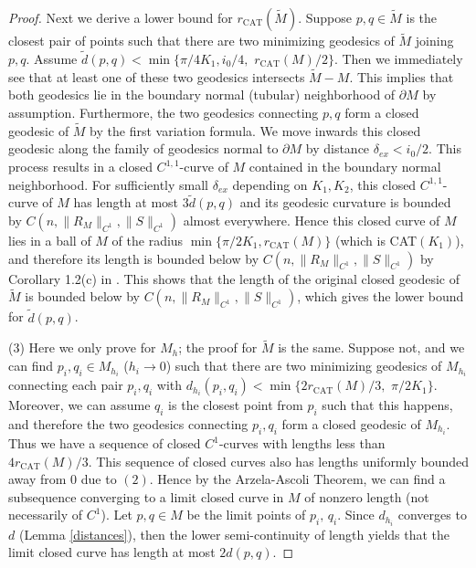 \documentclass[11pt,letterpaper]{amsart}
\numberwithin{equation}{section}
\theoremstyle{definition}
\theoremstyle{plain}
\theoremstyle{definition}
\theoremstyle{plain}
\theoremstyle{definition}
\theoremstyle{plain}
\begin{document}
\begin{proof}
Next we derive a lower bound for $r_{\textrm{CAT}}(\widetilde{M})$. Suppose $p,q\in \widetilde{M}$ is the closest pair of points such that there are two minimizing geodesics of $\widetilde{M}$ joining $p,q$. Assume $\widetilde{d}(p,q)<\min\{\pi/4K_1,i_0/4,$ $r_{\textrm{CAT}}(M)/2\}$. Then we immediately see that at least one of these two geodesics intersects $\widetilde{M}-M$.
This implies that both geodesics lie in the boundary normal (tubular) neighborhood of $\partial M$ by assumption. 
Furthermore, the two geodesics connecting $p,q$ form a closed geodesic of $\widetilde{M}$ by the first variation formula. 
We move inwards this closed geodesic along the family of geodesics normal to $\partial M$ by distance $\delta_{ex}<i_0/2$. This process results in a closed $C^{1,1}$-curve of $M$ contained in the boundary normal neighborhood.
For sufficiently small $\delta_{ex}$ depending on $K_1,K_2$, this closed $C^{1,1}$-curve of $M$ has length at most $3\widetilde{d}(p,q)$ and its geodesic curvature is bounded by $C(n,\|R_M\|_{C^1},\|S\|_{C^1})$ almost everywhere. 
Hence this closed curve of $M$ lies in a ball of $M$ of the radius $\min\{\pi/2K_1,r_{\textrm{CAT}}(M)\}$ (which is CAT$(K_1)$),
and therefore its length is bounded below by $C(n,\|R_M\|_{C^1},\|S\|_{C^1})$ by Corollary 1.2(c) in \cite{AB}. This shows that the length of the original closed geodesic of $\widetilde{M}$ is bounded below by $C(n,\|R_M\|_{C^1},\|S\|_{C^1})$, which gives the lower bound for $\widetilde{d}(p,q)$.

\smallskip
\noindent (3) Here we only prove for $M_h$; the proof for $\widetilde{M}$ is the same. Suppose not, and we can find $p_i,q_i\in M_{h_i}$ ($h_i\to 0$) such that there are two minimizing geodesics of $M_{h_i}$ connecting each pair $p_i,q_i$ with $d_{h_i}(p_i,q_i)<\min\{2r_{\textrm{CAT}}(M)/3,$ $\pi/2K_1\}$. Moreover, we can assume $q_i$ is the closest point from $p_i$ such that this happens, and therefore the two geodesics connecting $p_i,q_i$ form a closed geodesic of $M_{h_i}$. 
Thus we have a sequence of closed $C^1$-curves with lengths less than $4r_{\textrm{CAT}}(M)/3$. This sequence of closed curves also has lengths uniformly bounded away from $0$ due to $(2)$. Hence by the Arzela-Ascoli Theorem, we can find a subsequence converging to a limit closed curve in $M$ of nonzero length (not necessarily of $C^1$). Let $p,q\in M$ be the limit points of $p_i,\,q_i$. Since $d_{h_i}$ converges to $d$ (Lemma \ref{distances}), then the lower semi-continuity of length yields that the limit closed curve has length at most $2d(p,q)$.


\end{proof}
\end{document}
